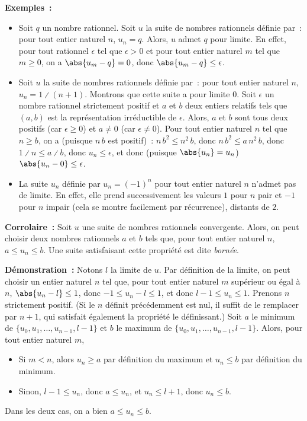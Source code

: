 \medskip

\noindent\textbf{Exemples :} 
\begin{itemize}[nosep]
    \item Soit $q$ un nombre rationnel. 
        Soit $u$ la suite de nombres rationnels définie par : pour tout entier naturel $n$, $u_n = q$.
        Alors, $u$ admet $q$ pour limite.
        En effet, pour tout rationnel $\epsilon$ tel que $\epsilon > 0$ et pour tout entier naturel $m$ tel que $m \geq 0$, on a $\abs{u_m - q} = 0$, donc $\abs{u_m - q} \leq \epsilon$.
    \item Soit $u$ la suite de nombres rationnels définie par : pour tout entier naturel $n$, $u_n = 1 \divslash (n+1)$.
        Montrons que cette suite a pour limite $0$. 
        Soit $\epsilon$ un nombre rationnel strictement positif et $a$ et $b$ deux entiers relatifs tels que $(a, b)$ est la représentation irréductible de $\epsilon$.
        Alors, $a$ et $b$ sont tous deux positifs (car $\epsilon \geq 0$) et $a \neq 0$ (car $\epsilon \neq 0$).
        Pour tout entier naturel $n$ tel que $n \geq b$, on a (puisque $n \, b$ est positif) : $n \, b^2 \leq n^2 \, b$, donc $n \, b^2 \leq a \, n^2 \, b$, donc $1 \divslash n \leq a \divslash b$, donc $u_n \leq \epsilon$, et donc (puisque $\abs{u_n} = u_n$) $\abs{u_n - 0} \leq \epsilon$.
    \item La suite $u_n$ définie par $u_n = (-1)^n$ pour tout entier naturel $n$ n'admet pas de limite.
        En effet, elle prend successivement les valeurs $1$ pour $n$ pair et $-1$ pour $n$ impair (cela se montre facilement par récurrence), distants de $2$. 
\end{itemize}

\medskip

\noindent\textbf{Corrolaire :} Soit $u$ une suite de nombres rationnels convergente.
    Alors, on peut choisir deux nombres rationnels $a$ et $b$ tels que, pour tout entier naturel $n$, $a \leq u_n \leq b$.
    Une suite satisfaisant cette propriété est dite \emph{bornée}.

\medskip

\noindent\textbf{Démonstration :} Notons $l$ la limite de $u$.
    Par définition de la limite, on peut choisir un entier naturel $n$ tel que, pour tout entier naturel $m$ supérieur ou égal à $n$, $\abs{u_n-l} \leq 1$, donc $-1 \leq u_n-l \leq 1$, et donc $l-1 \leq u_n \leq 1$. 
    Prenons $n$ strictement positif.
    (Si le $n$ définit précédemment est nul, il suffit de le remplacer par $n+1$, qui satisfait également la propriété le définissant.)
    Soit $a$ le minimum de $\lbrace u_0, u_1, \dots, u_{n-1}, l-1 \rbrace$ et $b$ le maximum de $\lbrace u_0, u_1, \dots, u_{n-1}, l-1 \rbrace$.
    Alors, pour tout entier naturel $m$, 
    \begin{itemize}[nosep]
        \item Si $m < n$, alors $u_n \geq a$ par définition du maximum et $u_n \leq b$ par définition du minimum.
        \item Sinon, $l-1 \leq u_n$, donc $a \leq u_n$, et $u_n \leq l+1$, donc $u_n \leq b$.
    \end{itemize}
    Dans les deux cas, on a bien $a \leq u_n \leq b$.

